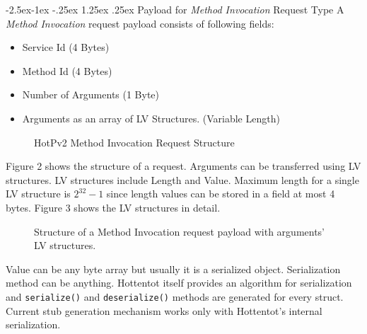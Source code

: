 \documentclass[10pt,a4paper]{article}
\makeatletter
\renewcommand\paragraph{\@startsection{paragraph}{4}{\z@}%
            {-2.5ex\@plus -1ex \@minus -.25ex}%
            {1.25ex \@plus .25ex}%
            {\normalfont\normalsize\bfseries}}
\makeatother
\begin{document}
\paragraph{Payload for \textit{Method Invocation} Request Type}
A \textit{Method Invocation} request payload consists of following fields:
\begin{itemize}
  \item Service Id (4 Bytes)
  \item Method Id (4 Bytes)
  \item Number of Arguments (1 Byte)
  \item Arguments as an array of LV Structures. (Variable Length)
\end{itemize}

\begin{figure}[!ht]
  \caption{HotPv2 Method Invocation Request Structure}
  \centering
\end{figure}

Figure 2 shows the structure of a request. Arguments can be transferred using LV structures. LV structures include Length and Value. Maximum length for a single LV structure is $2^{32} - 1$ since length values can be stored in a field at most 4 bytes. Figure 3 shows the LV structures in detail.

\begin{figure}[!ht]
  \caption{Structure of a Method Invocation request payload with arguments' LV structures.}
  \centering
\end{figure}

Value can be any byte array but usually it is a serialized object. Serialization method can be anything. Hottentot itself provides an algorithm for serialization and \texttt {serialize()} and \texttt {deserialize()} methods are generated for every struct. Current stub generation mechanism works only with Hottentot's internal serialization.
\end{document}
